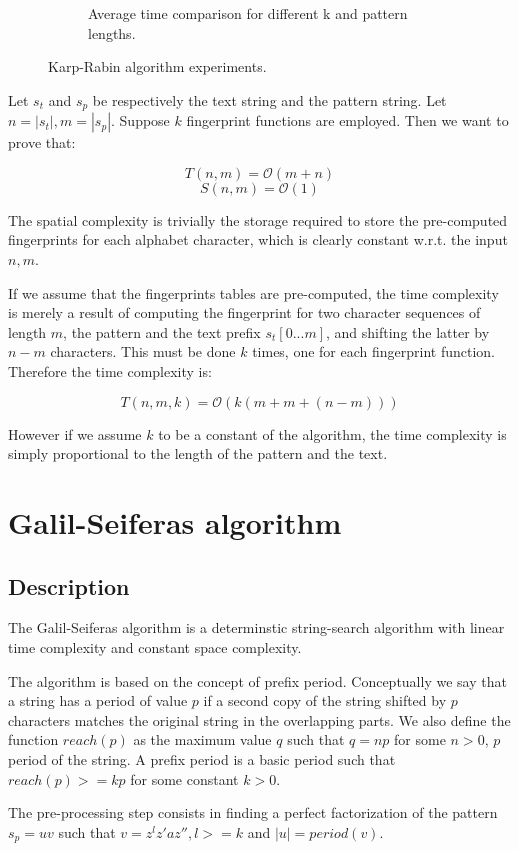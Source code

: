 \documentclass{article}
\begin{document}
\begin{figure}
\begin{subfigure}[b]{0.4\linewidth}
    \caption{Average time comparison for different k and pattern lengths.}
  \end{subfigure}
  \caption{Karp-Rabin algorithm experiments.}
  \label{fig:karp}
\end{figure}

Let $s_t$ and $s_p$ be respectively the text string and the pattern string. Let $n = |s_t|, m = |s_p|$. Suppose $k$ fingerprint functions are employed. Then we want to prove that:

$$T(n, m) = \mathcal{O}(m + n)$$
$$S(n, m) = \mathcal{O}(1)$$

The spatial complexity is trivially the storage required to store the pre-computed fingerprints for each alphabet character, which is clearly constant w.r.t. the input $n, m$.

If we assume that the fingerprints tables are pre-computed, the time complexity is merely a result of computing the fingerprint for two character sequences of length $m$, the pattern and the text prefix $s_t[0 ... m]$, and shifting the latter by $n - m$ characters. This must be done $k$ times, one for each fingerprint function. Therefore the time complexity is:

$$T(n, m, k) = \mathcal{O}(k (m + m + (n - m)))$$

However if we assume $k$ to be a constant of the algorithm, the time complexity is simply proportional to the length of the pattern and the text.

\section{Galil-Seiferas algorithm}

\subsection{Description}
The Galil-Seiferas algorithm is a determinstic string-search algorithm with linear time complexity and constant space complexity.

The algorithm is based on the concept of prefix period. Conceptually we say that a string has a period of value $p$ if a second copy of the string shifted by $p$ characters matches the original string in the overlapping parts. We also define the function $reach(p)$ as the maximum value $q$ such that $q = np$ for some $n > 0$, $p$ period of the string. A prefix period is a basic period such that $reach(p) >= kp$ for some constant $k > 0$.

The pre-processing step consists in finding a perfect factorization of the pattern $s_p = uv$ such that $v = z^lz'az'', l >= k$ and $|u| = period(v)$.
\end{document}

